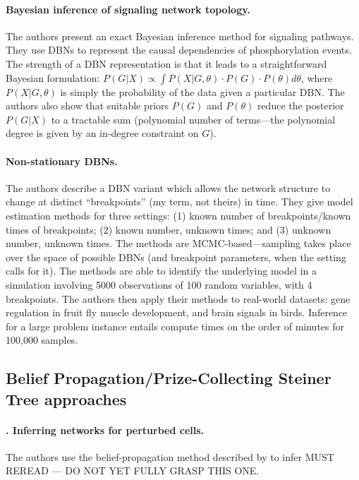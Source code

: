 \documentclass[14pt]{article}
\begin{document}
\paragraph{ \citet{hill-bayesian-2012} Bayesian inference of signaling network topology.}
The authors present an exact Bayesian inference method for signaling pathways.
They use DBNs to represent the causal dependencies of phosphorylation events.
The strength of a DBN representation is that it leads to a straightforward Bayesian formulation:
$P(G|X) \propto \int P(X|G, \theta) \cdot P(G) \cdot P(\theta) d\theta$, where $P(X|G, \theta)$ is
simply the probability of the data given a particular DBN.
The authors also show that suitable priors $P(G)$ and $P(\theta)$ reduce the posterior $P(G|X)$
to a tractable sum (polynomial number of terms---the polynomial degree is given by an in-degree constraint on $G$).

\paragraph{ \citet{2010-robinson-nsdbn} Non-stationary DBNs.}
The authors describe a DBN variant which allows the network structure
to change at distinct ``breakpoints'' (my term, not theirs) in time.
They give model estimation methods for three settings: (1) known number of breakpoints/known times of breakpoints; (2) known number, unknown times; and (3) unknown number, unknown times.
The methods are MCMC-based---sampling takes place over the space of possible DBNs (and breakpoint parameters, when the setting calls for it).
The methods are able to identify the underlying model in a simulation involving 5000 observations of 100 random variables, with 4 breakpoints.
The authors then apply their methods to real-world datasets: gene regulation in fruit fly muscle development, and brain signals in birds.
Inference for a large problem instance entails compute times on the order of minutes for 100,000 samples.




\subsection{Belief Propagation/Prize-Collecting Steiner Tree approaches}

\paragraph{ \citet{2013-molinelli-perturbation}. Inferring networks for perturbed cells.}
The authors use the belief-propagation method described by \citeauthor{2012-biazzo-steiner} to infer 
MUST REREAD --- DO NOT YET FULLY GRASP THIS ONE.
\end{document}
